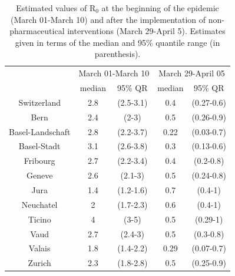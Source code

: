 \begin{table}[]
    \centering
        \caption[Estimated values of R$_0$ at the beginning of the epidemic]{Estimated values of R$_0$ at the beginning of the epidemic (March 01-March 10) and after the implementation of non-pharmaceutical interventions (March 29-April 5). Estimates given in terms of the median and 95\% quantile range (in parenthesis).}

\begin{tabular}{ccccc}
\toprule
\multicolumn{1}{c}{ } & \multicolumn{2}{c}{March 01-March 10} & \multicolumn{2}{c}{March 29-April 05} \\
\cmidrule(l{3pt}r{3pt}){2-3} \cmidrule(l{3pt}r{3pt}){4-5}
 & median & 95\% QR & median & 95\% QR\\
\midrule
Switzerland & 2.8 & (2.5-3.1) & 0.4 & (0.27-0.6)\\
Bern & 2.4 & (2-3) & 0.5 & (0.26-0.9)\\
Basel-Landschaft & 2.8 & (2.2-3.7) & 0.22 & (0.03-0.7)\\
Basel-Stadt & 3.1 & (2.6-3.8) & 0.3 & (0.13-0.6)\\
Fribourg & 2.7 & (2.2-3.4) & 0.4 & (0.2-0.8)\\
Geneve & 2.6 & (2.1-3) & 0.5 & (0.24-0.8)\\
Jura & 1.4 & (1.2-1.6) & 0.7 & (0.4-1)\\
Neuchatel & 2 & (1.7-2.3) & 0.6 & (0.4-1)\\
Ticino & 4 & (3-5) & 0.5 & (0.29-1)\\
Vaud & 2.7 & (2.4-3) & 0.5 & (0.3-0.8)\\
Valais & 1.8 & (1.4-2.2) & 0.29 & (0.07-0.7)\\
Zurich & 2.3 & (1.8-2.8) & 0.5 & (0.25-0.9)\\
\bottomrule
\end{tabular}
    \label{tab:r0}
\end{table}


